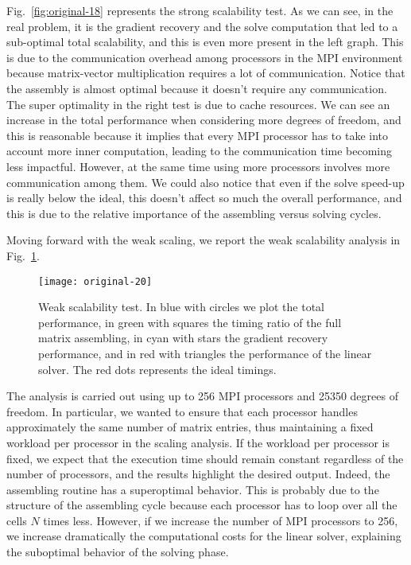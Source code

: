 Fig.~\ref{fig:original-18} represents the strong scalability test. As we can see, in the real problem, it is the gradient
recovery and the solve computation that led to a sub-optimal total scalability, and this is even more present in the left graph. This is due to the communication overhead among processors in the
MPI environment because matrix-vector multiplication requires a lot of communication. Notice that the assembly is almost optimal because it doesn’t require any communication. The super optimality in the right test is due to cache resources. We can see an increase in the total performance when considering more degrees of freedom, and this is reasonable because it implies that every MPI processor has to take into account more inner computation,
leading to the communication time becoming less impactful. However, at the same time using more processors involves more communication among them. We could also notice that even
if the solve speed-up is really below the ideal, this doesn’t affect so much the overall performance, and this is due to the relative importance of the assembling versus solving cycles.

Moving forward with the weak scaling, we report the weak scalability analysis in Fig.~\ref{fig:original-20}.

\begin{figure}[htp]
\begin{center}
    \texttt{[image: original-20]}    %
    \caption{Weak scalability test. In blue with circles we plot the total performance, in green with squares the timing ratio of the full matrix assembling, in cyan with stars the gradient recovery performance, and in red with triangles the performance of the linear solver. The red dots represents the ideal timings.} 
    \label{fig:original-20}
\end{center}
\end{figure}

The analysis is carried out using up to 256 MPI processors and 25350 degrees of freedom. In particular, we wanted to ensure that each processor handles approximately the same number of matrix entries, thus maintaining a fixed workload per processor in the scaling analysis. If the workload per processor is fixed, we expect that the execution time should remain constant regardless of the number of processors, and the results highlight the desired output. Indeed, the assembling routine has a superoptimal behavior. This is probably due to the structure of the assembling cycle because each processor has to loop over all the cells $N$ times less. However, if we increase the number of MPI processors to 256, we increase dramatically the computational costs for the linear solver, explaining the suboptimal behavior of the solving phase.